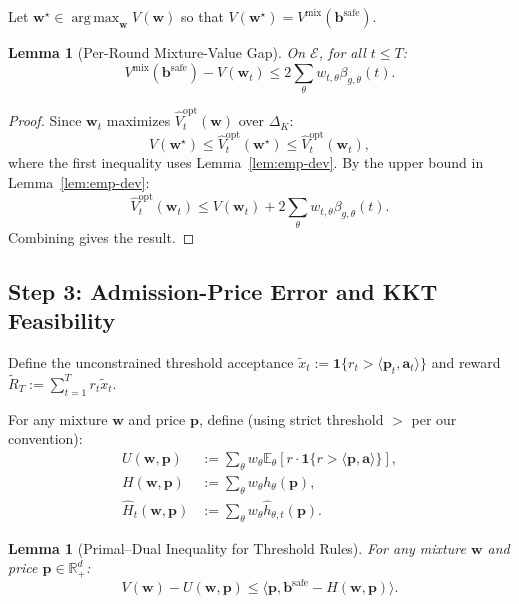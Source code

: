 \documentclass[11pt]{article}
\newtheorem{lemma}[theorem]{Lemma}
\newcommand{\bbS}{\mathbf{b}^{\mathrm{safe}}}
\newcommand{\ba}{\mathbf{a}}
\newcommand{\bp}{\mathbf{p}}
\newcommand{\bw}{\mathbf{w}}
\newcommand{\E}{\mathbb{E}}
\newcommand{\R}{\mathbb{R}}
\newcommand{\cE}{\mathcal{E}}
\DeclareMathOperator*{\argmax}{arg\,max}
\begin{document}
Let $\bw^\star \in \argmax_\bw V(\bw)$ so that $V(\bw^\star) = V^{\mathrm{mix}}(\bbS)$.

\begin{lemma}[Per-Round Mixture-Value Gap]
\label{lem:per-round-gap}
On $\cE$, for all $t \le T$:
\[
V^{\mathrm{mix}}(\bbS) - V(\bw_t) \le 2 \sum_\theta w_{t,\theta} \beta_{g,\theta}(t).
\]
\end{lemma}

\begin{proof}
Since $\bw_t$ maximizes $\widehat{V}_t^{\mathrm{opt}}(\bw)$ over $\Delta_K$:
\[
V(\bw^\star) \le \widehat{V}_t^{\mathrm{opt}}(\bw^\star) \le \widehat{V}_t^{\mathrm{opt}}(\bw_t),
\]
where the first inequality uses Lemma~\ref{lem:emp-dev}. By the upper bound in Lemma~\ref{lem:emp-dev}:
\[
\widehat{V}_t^{\mathrm{opt}}(\bw_t) \le V(\bw_t) + 2\sum_\theta w_{t,\theta} \beta_{g,\theta}(t).
\]
Combining gives the result.
\end{proof}

\subsection{Step 3: Admission-Price Error and KKT Feasibility}

Define the unconstrained threshold acceptance $\tilde{x}_t := \mathbf{1}\{r_t > \langle \bp_t, \ba_t \rangle\}$ and reward $\tilde{R}_T := \sum_{t=1}^T r_t \tilde{x}_t$.

For any mixture $\bw$ and price $\bp$, define (using strict threshold $>$ per our convention):
\begin{align*}
U(\bw, \bp) &:= \sum_\theta w_\theta \E_\theta[r \cdot \mathbf{1}\{r > \langle \bp, \ba \rangle\}], \\
H(\bw, \bp) &:= \sum_\theta w_\theta h_\theta(\bp), \\
\widehat{H}_t(\bw, \bp) &:= \sum_\theta w_\theta \widehat{h}_{\theta,t}(\bp).
\end{align*}

\begin{lemma}[Primal--Dual Inequality for Threshold Rules]
\label{lem:primal-dual}
For any mixture $\bw$ and price $\bp \in \R^d_+$:
\[
V(\bw) - U(\bw, \bp) \le \langle \bp, \bbS - H(\bw, \bp) \rangle.
\]
\end{lemma}
\end{document}
